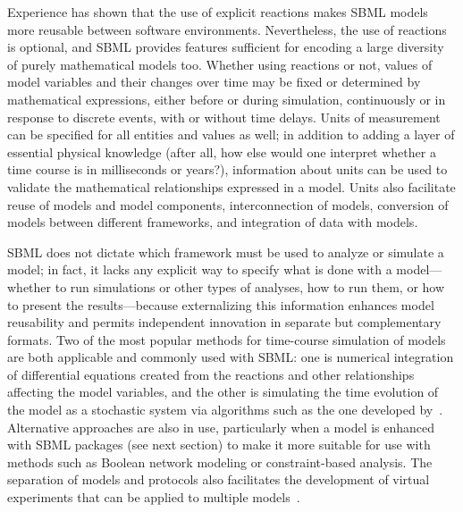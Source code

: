 \documentclass[]{draft-sbml-paper}
\begin{document}
Experience has shown that the use of explicit reactions makes SBML models more reusable between software environments.  Nevertheless, the use of reactions is optional, and SBML provides features sufficient for encoding a large diversity of purely mathematical models too.  Whether using reactions or not, values of model variables and their changes over time may be fixed or determined by mathematical expressions, either before or during simulation, continuously or in response to discrete events, with or without time delays.  Units of measurement can be specified for all entities and values as well; in addition to adding a layer of essential physical knowledge (after all, how else would one interpret whether a time course is in milliseconds or years?), information about units can be used to validate the mathematical relationships expressed in a model.  Units also facilitate reuse of models and model components, interconnection of models, conversion of models between different frameworks, and integration of data with models.

SBML does not dictate which framework must be used to analyze or simulate a model; in fact, it lacks any explicit way to specify what is done with a model---whether to run simulations or other types of analyses, how to run them, or how to present the results---because externalizing this information enhances model reusability and permits independent innovation in separate but complementary formats.  Two of the most popular methods for time-course simulation of models are both applicable and commonly used with SBML: one is numerical integration of differential equations created from the reactions and other relationships affecting the model variables, and the other is simulating the time evolution of the model as a stochastic system via algorithms such as the one developed by~\cite{gillespie1977exact}.  Alternative approaches are also in use, particularly when a model is enhanced with SBML packages (see next section) to make it more suitable for use with methods such as Boolean network modeling or constraint-based analysis.  The separation of models and protocols also facilitates the development of virtual experiments that can be applied to multiple models~\citep{Cooper2015call}.
\end{document}
